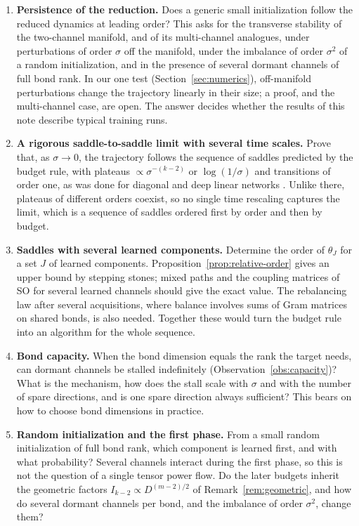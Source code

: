 \documentclass[11pt]{article}
\newcommand{\SO}{\textsf{SO}}
\theoremstyle{definition}
\numberwithin{equation}{section}
\begin{document}
\begin{enumerate}[label=\textbf{Q\arabic*.},leftmargin=*,itemsep=3pt]
\item \textbf{Persistence of the reduction.} Does a generic small initialization follow the reduced dynamics at leading order? This asks for the transverse stability of the two-channel manifold, and of its multi-channel analogues, under perturbations of order $\sigma$ off the manifold, under the imbalance of order $\sigma^2$ of a random initialization, and in the presence of several dormant channels of full bond rank. In our one test (Section~\ref{sec:numerics}), off-manifold perturbations change the trajectory linearly in their size; a proof, and the multi-channel case, are open. The answer decides whether the results of this note describe typical training runs.
\item \textbf{A rigorous saddle-to-saddle limit with several time scales.} Prove that, as $\sigma\to0$, the trajectory follows the sequence of saddles predicted by the budget rule, with plateaus $\propto\sigma^{-(k-2)}$ or $\log(1/\sigma)$ and transitions of order one, as was done for diagonal and deep linear networks \citep{pesme2023saddle,jacot2021saddle}. Unlike there, plateaus of different orders coexist, so no single time rescaling captures the limit, which is a sequence of saddles ordered first by order and then by budget.
\item \textbf{Saddles with several learned components.} Determine the order of $\theta_J$ for a set $J$ of learned components. Proposition~\ref{prop:relative-order} gives an upper bound by stepping stones; mixed paths and the coupling matrices of \SO{} for several learned channels should give the exact value. The rebalancing law after several acquisitions, where balance involves sums of Gram matrices on shared bonds, is also needed. Together these would turn the budget rule into an algorithm for the whole sequence.
\item \textbf{Bond capacity.} When the bond dimension equals the rank the target needs, can dormant channels be stalled indefinitely (Observation~\ref{obs:capacity})? What is the mechanism, how does the stall scale with $\sigma$ and with the number of spare directions, and is one spare direction always sufficient? This bears on how to choose bond dimensions in practice.
\item \textbf{Random initialization and the first phase.} From a small random initialization of full bond rank, which component is learned first, and with what probability? Several channels interact during the first phase, so this is not the question of a single tensor power flow. Do the later budgets inherit the geometric factors $I_{k-2}\propto D^{(m-2)/2}$ of Remark~\ref{rem:geometric}, and how do several dormant channels per bond, and the imbalance of order $\sigma^2$, change them?

\end{enumerate}
\end{document}
